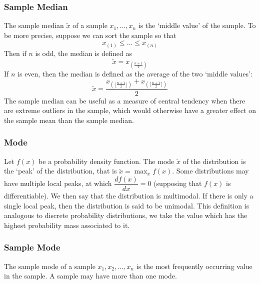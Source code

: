 \documentclass[11pt]{report} %
\begin{document}
\subsubsection{Sample Median}

The sample median $\widetilde{x}$ of a sample $x_{1}, \dots, x_{n}$ is the `middle value' of the sample. To be more precise, suppose we can sort the sample so that
\begin{equation}
x_{\left(1\right)} \leq \dots \leq x_{\left(n\right)}
\end{equation}
Then if $n$ is odd, the median is defined as
\begin{equation}
\widetilde{x} = x_{\left(\frac{n + 1}{2}\right)}
\end{equation}
If $n$ is even, then the median is defined as the average of the two `middle values':
\begin{equation}
\widetilde{x} = \dfrac{x_{\left(\lfloor\frac{n + 1}{2}\rfloor\right)} + x_{\left(\lceil\frac{n + 1}{2}\rceil\right)}}{2}
\end{equation}
The sample median can be useful as a measure of central tendency when there are extreme outliers in the sample, which would otherwise have a greater effect on the sample mean than the sample median.

\subsubsection{Mode}

Let $f\left(x\right)$ be a probability density function. The mode $\breve{x}$ of the distribution is the `peak' of the distribution, that is $\breve{x} = \max_{x}f\left(x\right)$. Some distributions may have multiple local peaks, at which $\dfrac{df\left(x\right)}{dx} = 0$ (supposing that $f\left(x\right)$ is differentiable). We then say that the distribution is multimodal. If there is only a single local peak, then the distribution is said to be unimodal. This definition is analogous to discrete probability distributions, we take the value which has the highest probability mass associated to it.

\subsubsection{Sample Mode}

The sample mode of a sample $x_{1}, x_{2}, \dots, x_{n}$ is the most frequently occurring value in the sample. A sample may have more than one mode.
\end{document}
